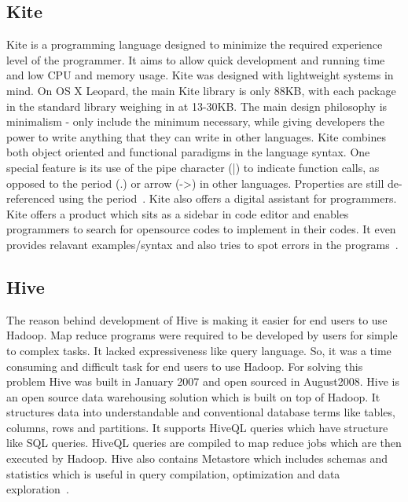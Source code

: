 \subsection{Kite}

Kite is a programming language designed to minimize the required
experience level of the programmer.  It aims to allow quick
development and running time and low CPU and memory usage. Kite was
designed with lightweight systems in mind.  On OS X Leopard, the main
Kite library is only 88KB, with each package in the standard library
weighing in at 13-30KB. The main design philosophy is minimalism -
only include the minimum necessary, while giving developers the power
to write anything that they can write in other languages. Kite
combines both object oriented and functional paradigms in the language
syntax.  One special feature is its use of the pipe character (|) to
indicate function calls, as opposed to the period (.) or arrow (->) in
other languages.  Properties are still de-referenced using the
period~\cite{kite-devtopics}. Kite also offers a digital assistant for
programmers. Kite offers a product which sits as a sidebar in code
editor and enables programmers to search for opensource codes to
implement in their codes. It even provides relavant examples/syntax
and also tries to spot errors in the programs~\cite{kite-wired}.
	   
\subsection{Hive}
     
The reason behind development of Hive is making it easier for end
users to use Hadoop. Map reduce programs were required to be developed
by users for simple to complex tasks. It lacked expressiveness like
query language. So, it was a time consuming and difficult task for end
users to use Hadoop. For solving this problem Hive was built in
January 2007 and open sourced in August2008.  Hive is an open source
data warehousing solution which is built on top of Hadoop. It
structures data into understandable and conventional database terms
like tables, columns, rows and partitions. It supports HiveQL queries
which have structure like SQL queries. HiveQL queries are compiled to
map reduce jobs which are then executed by Hadoop.  Hive also contains
Metastore which includes schemas and statistics which is useful in
query compilation, optimization and data exploration~\cite{www-hive}.

     \pv

